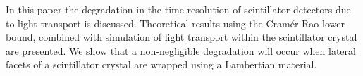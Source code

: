 In this paper the degradation in the time resolution of scintillator detectors due to light transport is discussed. Theoretical results using the Cram\'{e}r-Rao lower bound, combined with simulation of light transport within the scintillator crystal are presented. We show that a non-negligible degradation will occur when lateral facets of a scintillator crystal are wrapped using a Lambertian material.
